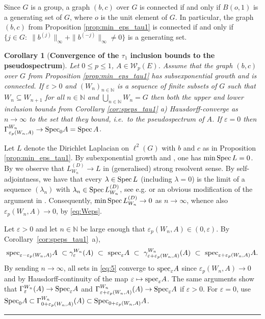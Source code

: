 \documentclass{article}
\newcommand{\bl}[1]{\textcolor{blue}{#1}}   %
\newcommand\N{{\mathbb N}}
\newcommand\W{{\mathcal W}}
\newcommand\eps{{\varepsilon}}
\newcommand\specn{{\rm spec}}   %
\newcommand\speps{{\rm spec}_\eps}
\newcommand\Specn{{\rm Spec}}   %
\newcommand\Spec{{\rm Spec}\,}  %
\newcommand\Speps{{\rm Spec}_\eps}
\newtheorem{corollary}[theorem]{Corollary}
\newcommand\Proofend{\rule{2mm}{2mm}}
\renewenvironment{proof}
 {\par\noindent{\bf Proof.}}
 {\Proofend\par\pagebreak[2]}
\numberwithin{equation}{section}   %
\numberwithin{figure}{section}  %
\begin{document}
Since $G$ is a group, a graph $(b,c)$ over $G$ is connected if and only if $B(o,1)$ is a generating set of $G$, where $o$ is the unit element of $G$. In particular, the graph $(b,c)$ from Proposition \ref{prop:min_eps_tau1} is connected if and only if $\{j\in G:\; \|b^{(j)}\|_\infty + \|b^{(-j)}\|_\infty \neq 0\}$ is a generating set.


\begin{corollary}[\bf Convergence of the $\tau_1$ inclusion bounds to the pseudospectrum] \label{cor:conv_tau1}
Let $0\leq p\leq 1$, $A\in\W_p(E)$.
Assume that the graph $(b,c)$ over $G$ from Proposition \ref{prop:min_eps_tau1} has subsexponential growth and is connected.
If $\eps>0$ and 
$(W_n)_{n\in\N}$ is a sequence of finite subsets of $G$ such that $W_n\subseteq W_{n+1}$ for all $n\in\N$ and $\bigcup_{n\in\N} W_n = G$
then both the upper and lower inclusion bounds from Corollary \ref{cor:speps_tau1} a) Hausdorff-converge as $n\to\infty$ to the set that they bound, i.e.~to the pseudospectrum of $A$. If $\eps=0$ then $\Gamma_{\eps_p(W_n,A)}^{W_n}\to\Specn_0 A=\Spec A$.
\end{corollary}
\begin{proof}
Let $L$ denote the Dirichlet Laplacian on $\ell^2(G)$ with $b$ and $c$ as in Proposition \ref{prop:min_eps_tau1}. By subexponential growth and \cite[Theorem 13.8]{KellerLenzWojciechowskiBook}, one has $\min\Spec L = 0$. By \cite[Lemma 1.21]{KellerLenzWojciechowskiBook} we observe that $L_{W_n}^{(D)}\to L$ in (generalised) strong resolvent sense. By self-adjointness, we have that every $\lambda\in \Spec L$ (including $\lambda=0$) is the limit of a sequence $(\lambda_n)$ with $\lambda_n\in \Spec L_{W_n}^{(D)}$, see e.g. \cite[Thm.~VIII.24(a)]{ReedSimon1} or an obvious modification of the argument in \cite[Thm.~7.2]{HaRoSi2}. Consequently, $\min\Spec L_{W_n}^{(D)}\to 0$ as $n\to\infty$, whence also $\eps_p(W_n,A)\to 0$, by \eqref{eq:Weps}.

Let $\eps>0$ and let 
$n\in\N$ be large enough that $\eps_p(W_n,A)\in (0,\eps)$. 
By Corollary~\ref{cor:speps_tau1}~a), 
\begin{equation} \label{eq:5}
\specn_{\eps-\eps_p(W_n,A)}A\ \subset \gamma_{\eps}^{W_n}(A)\ \subset\ \speps A\ \subset\  \gamma_{\eps+\eps_p(W_n,A)}^{W_n}(A)\ \subset\ \specn_{\eps+\eps_p(W_n,A)}A.
\end{equation}
By sending 
$n\to \infty$, all sets in \eqref{eq:5} converge to $\speps A$ since $\eps_p(W_n,A)\to 0$ and by Hausdorff-continuity of the map $\eps\mapsto\speps A$.  The same arguments show that $\Gamma_{\eps}^{W_n}(A)\to\Speps A$ and $\Gamma_{\eps+\eps_p(W_n,A)}^{W_n}(A)\to\Speps A$ if $\eps>0$. For $\eps=0$, use $\Specn_0 A \subset  \Gamma_{0+\eps_p(W_n,A)}^{W_n}(A) \subset \Specn_{0+\eps_p(W_n,A)}A$.
\end{proof}
\end{document}
